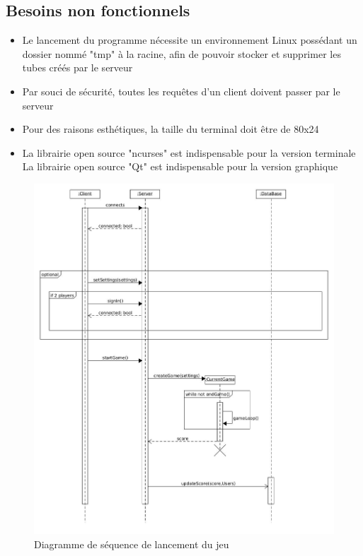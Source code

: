 \documentclass[a4paper,12pt]{article}
\begin{document}
\subsection{Besoins non fonctionnels}
\begin{itemize}
    \item Le lancement du programme nécessite un environnement Linux possédant un dossier nommé "tmp" à la racine, afin de pouvoir stocker et supprimer les tubes créés par le serveur
    \item Par souci de sécurité, toutes les requêtes d'un client doivent passer par le serveur
    \item Pour des raisons esthétiques, la taille du terminal doit être de 80x24
    \item La librairie open source "ncurses" est indispensable pour la version terminale
    \itme La librairie open source "Qt" est indispensable pour la version graphique
    
\end{itemize}

\begin{figure}
\centering
\includegraphics[scale=0.3]{images/sequence_diagram_StartGame}
\caption{Diagramme de séquence de lancement du jeu}
\end{figure}
\end{document}
